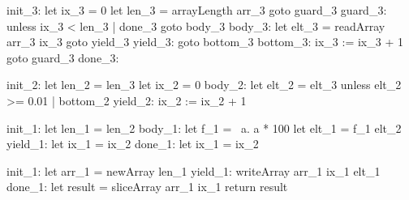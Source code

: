 \documentclass[preamble.tex]{subfiles}
\begin{document}




\begin{loopcode}[%
]
init_3:
  let ix_3 = 0
  let len_3 = arrayLength arr_3
  goto guard_3
guard_3:
  unless ix_3 < len_3 | done_3
  goto body_3
body_3:
  let elt_3 = readArray arr_3 ix_3
  goto yield_3
yield_3:
  goto bottom_3
bottom_3:
  ix_3 := ix_3 + 1
  goto guard_3
done_3:
\end{loopcode}

\begin{loopcode}[%
]
init_2:
  let len_2 = len_3
  let ix_2 = 0
body_2:
  let elt_2 = elt_3
  unless elt_2 >= 0.01 | bottom_2
yield_2:
  ix_2 := ix_2 + 1
\end{loopcode}

\begin{loopcode}[%
]
init_1:
  let len_1 = len_2
body_1:
  let f_1 = \ a. a * 100
  let elt_1 = f_1 elt_2
yield_1:
  let ix_1 = ix_2
done_1:
  let ix_1 = ix_2
\end{loopcode}


\begin{loopcode}[%
]
init_1:
  let arr_1 = newArray len_1
yield_1:
  writeArray arr_1 ix_1 elt_1
done_1:
  let result = sliceArray arr_1 ix_1
  return result
\end{loopcode}
\end{document}
